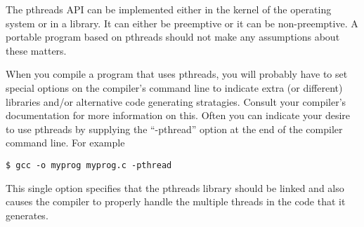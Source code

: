 \documentclass{article}
\begin{document}
The pthreads API can be implemented either in the kernel of the operating system or in a
library. It can either be preemptive or it can be non-preemptive. A portable program based on
pthreads should not make any assumptions about these matters.

When you compile a program that uses pthreads, you will probably have to set special options on
the compiler's command line to indicate extra (or different) libraries and/or alternative code
generating stratagies. Consult your compiler's documentation for more information on this. Often
you can indicate your desire to use pthreads by supplying the ``-pthread'' option at the end of
the compiler command line. For example

\begin{verbatim}
$ gcc -o myprog myprog.c -pthread
\end{verbatim}

This single option specifies that the pthreads library should be linked and also causes the
compiler to properly handle the multiple threads in the code that it generates.






\end{document}
